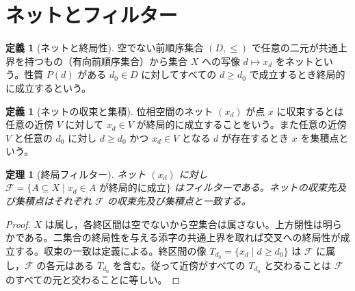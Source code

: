 \documentclass[a5paper,10pt,dvipdfmx]{jsarticle}
\theoremstyle{definition}
\newtheorem{defn}[ruledef]{定義}
\theoremstyle{plain}
\newtheorem{thm}[ruledef]{定理}
\begin{document}
\section{ネットとフィルター}
\begin{defn}[ネットと終局性]\label{k273}
空でない前順序集合 $(D,\leq)$ で任意の二元が共通上界を持つもの（有向前順序集合）から集合 $X$ への写像 $d\mapsto x_d$ をネットという。性質 $P(d)$ がある $d_0\in D$ に対してすべての $d\geq d_0$ で成立するとき終局的に成立するという。
\end{defn}
\begin{defn}[ネットの収束と集積]\label{k274}
位相空間のネット $(x_d)$ が点 $x$ に収束するとは任意の近傍 $V$ に対して $x_d\in V$ が終局的に成立することをいう。また任意の近傍 $V$ と任意の $d_0$ に対し $d\geq d_0$ かつ $x_d\in V$ となる $d$ が存在するとき $x$ を集積点という。
\end{defn}
\begin{thm}[終局フィルター]\label{k275}
ネット $(x_d)$ に対し $\mathcal F=\{A\subseteq X\mid x_d\in A\text{ が終局的に成立}\}$ はフィルターである。ネットの収束先及び集積点はそれぞれ $\mathcal F$ の収束先及び集積点と一致する。
\end{thm}
\begin{proof}
$X$ は属し，各終区間は空でないから空集合は属さない。上方閉性は明らかである。二集合の終局性を与える添字の共通上界を取れば交叉への終局性が成立する。収束の一致は定義による。終区間の像 $T_{d_0}=\{x_d\mid d\geq d_0\}$ は $\mathcal F$ に属し，$\mathcal F$ の各元はある $T_{d_0}$ を含む。従って近傍がすべての $T_{d_0}$ と交わることは $\mathcal F$ のすべての元と交わることに等しい。
\end{proof}
\end{document}
